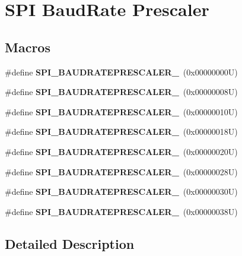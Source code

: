 \hypertarget{group___s_p_i___baud_rate___prescaler}{}\section{S\+PI Baud\+Rate Prescaler}
\label{group___s_p_i___baud_rate___prescaler}
\subsection*{Macros}
\begin{DoxyCompactItemize}
\item 
\mbox{\label{group___s_p_i___baud_rate___prescaler_ga3c1e615518e705b8120f164ff4c1968e}} 
\#define {\bfseries S\+P\+I\+\_\+\+B\+A\+U\+D\+R\+A\+T\+E\+P\+R\+E\+S\+C\+A\+L\+E\+R\+\_}~(0x00000000\+U)
\item 
\mbox{\label{group___s_p_i___baud_rate___prescaler_ga807568c52b5ba449d7a2b1b85549db24}} 
\#define {\bfseries S\+P\+I\+\_\+\+B\+A\+U\+D\+R\+A\+T\+E\+P\+R\+E\+S\+C\+A\+L\+E\+R\+\_}~(0x00000008\+U)
\item 
\mbox{\label{group___s_p_i___baud_rate___prescaler_ga2393359eb495f95163206e17194f4847}} 
\#define {\bfseries S\+P\+I\+\_\+\+B\+A\+U\+D\+R\+A\+T\+E\+P\+R\+E\+S\+C\+A\+L\+E\+R\+\_}~(0x00000010\+U)
\item 
\mbox{\label{group___s_p_i___baud_rate___prescaler_gad6a08d920ad4ee524cf55cd09e4c4d0e}} 
\#define {\bfseries S\+P\+I\+\_\+\+B\+A\+U\+D\+R\+A\+T\+E\+P\+R\+E\+S\+C\+A\+L\+E\+R\+\_}~(0x00000018\+U)
\item 
\mbox{\label{group___s_p_i___baud_rate___prescaler_ga53fda39d29f04b815f525b7f8c8dd9c2}} 
\#define {\bfseries S\+P\+I\+\_\+\+B\+A\+U\+D\+R\+A\+T\+E\+P\+R\+E\+S\+C\+A\+L\+E\+R\+\_}~(0x00000020\+U)
\item 
\mbox{\label{group___s_p_i___baud_rate___prescaler_ga64129361cbd23907d14144befe2209f4}} 
\#define {\bfseries S\+P\+I\+\_\+\+B\+A\+U\+D\+R\+A\+T\+E\+P\+R\+E\+S\+C\+A\+L\+E\+R\+\_}~(0x00000028\+U)
\item 
\mbox{\label{group___s_p_i___baud_rate___prescaler_ga939117a1ff97fbf4f1340cbb3141fb29}} 
\#define {\bfseries S\+P\+I\+\_\+\+B\+A\+U\+D\+R\+A\+T\+E\+P\+R\+E\+S\+C\+A\+L\+E\+R\+\_}~(0x00000030\+U)
\item 
\mbox{\label{group___s_p_i___baud_rate___prescaler_ga4debd0953aeeb470eae28a42aa8289c2}} 
\#define {\bfseries S\+P\+I\+\_\+\+B\+A\+U\+D\+R\+A\+T\+E\+P\+R\+E\+S\+C\+A\+L\+E\+R\+\_}~(0x00000038\+U)
\end{DoxyCompactItemize}


\subsection{Detailed Description}

